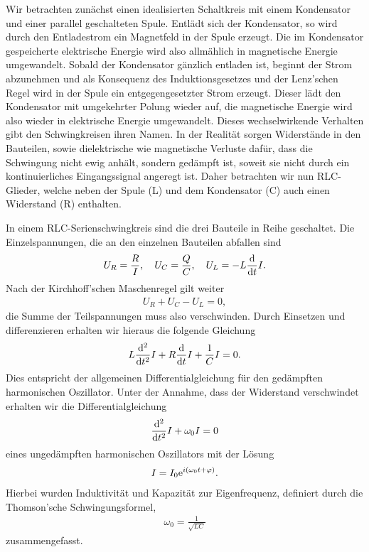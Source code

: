 Wir betrachten zunächst einen idealisierten Schaltkreis mit einem Kondensator und einer parallel geschalteten Spule. Entlädt sich der Kondensator, so wird durch den Entladestrom ein Magnetfeld in der Spule erzeugt. Die im Kondensator gespeicherte elektrische Energie wird also allmählich in magnetische Energie umgewandelt. Sobald der Kondensator gänzlich entladen ist, beginnt der Strom abzunehmen und als Konsequenz des Induktionsgesetzes und der Lenz'schen Regel wird in der Spule ein entgegengesetzter Strom erzeugt. Dieser lädt den Kondensator mit umgekehrter Polung wieder auf, die magnetische Energie wird also wieder in elektrische Energie umgewandelt. Dieses wechselwirkende Verhalten gibt den Schwingkreisen ihren Namen. In der Realität sorgen Widerstände in den Bauteilen, sowie dielektrische wie magnetische Verluste dafür, dass die Schwingung nicht ewig anhält, sondern gedämpft ist, soweit sie nicht durch ein kontinuierliches Eingangssignal angeregt ist. Daher betrachten wir nun RLC-Glieder, welche neben der Spule (L) und dem Kondensator (C) auch einen Widerstand (R) enthalten.

In einem RLC-Serienschwingkreis sind die drei Bauteile in Reihe geschaltet. Die Einzelspannungen, die an den einzelnen Bauteilen abfallen sind
\begin{align}
  U_R = \frac{R}{I}, \quad U_C = \frac{Q}{C}, \quad U_L = -L\dv{t}I.
\end{align}
Nach der Kirchhoff'schen Maschenregel gilt weiter
\begin{align}
  U_R + U_C - U_L = 0,
\end{align}
die Summe der Teilspannungen muss also verschwinden. Durch Einsetzen und differenzieren erhalten wir hieraus die folgende Gleichung
\begin{align}
  L \dv[2]{t} I + R \dv{t} I + \frac{1}{C} I = 0.
\end{align}
Dies entspricht der allgemeinen Differentialgleichung für den gedämpften harmonischen Oszillator. Unter der Annahme, dass der Widerstand verschwindet erhalten wir die Differentialgleichung
\begin{align}
  \dv[2]{t} I + \omega_0 I = 0
\end{align}
eines ungedämpften harmonischen Oszillators mit der Lösung
\begin{align}
  I = I_0 \text{e}^{i(\omega_0 t + \varphi)}.
\end{align}
Hierbei wurden Induktivität und Kapazität zur Eigenfrequenz, definiert durch die Thomson'sche Schwingungsformel,
\begin{align}
  \omega_0 = \frac{1}{\sqrt{LC}}
\end{align}
zusammengefasst.

